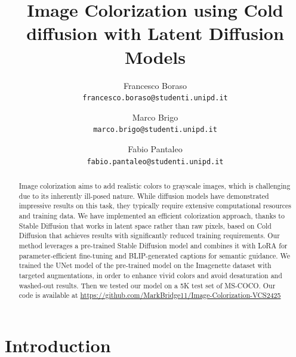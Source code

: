 \documentclass[10pt,twocolumn,letterpaper]{article}
\begin{document}
\title{Image Colorization using Cold diffusion with Latent Diffusion Models}

\author{Francesco Boraso\\
{\tt\small francesco.boraso@studenti.unipd.it}
\and
Marco Brigo\\
{\tt\small marco.brigo@studenti.unipd.it}
\and
Fabio Pantaleo\\
{\tt\small fabio.pantaleo@studenti.unipd.it}
}

\maketitle

\begin{abstract}
Image colorization aims to add realistic colors to grayscale images, which is challenging due to its inherently ill-posed nature. While diffusion models have demonstrated impressive results on this task, they typically require extensive computational resources and training data. We have implemented an efficient colorization approach, thanks to Stable Diffusion that works in latent space rather than raw pixels, based on Cold Diffusion that achieves results with significantly reduced training requirements. Our method leverages a pre-trained Stable Diffusion model and combines it with LoRA for parameter-efficient fine-tuning and BLIP-generated captions for semantic guidance. We trained the UNet model of the pre-trained model on the Imagenette dataset with targeted augmentations, in order to enhance vivid colors and avoid desaturation and washed-out results. Then we tested our model on a 5K test set of MS-COCO.  Our code is available at \href{https://github.com/MarkBridge11/Image-Colorization-VCS2425}{https://github.com/MarkBridge11/Image-Colorization-VCS2425}
\end{abstract}

\section{Introduction}
\end{document}
